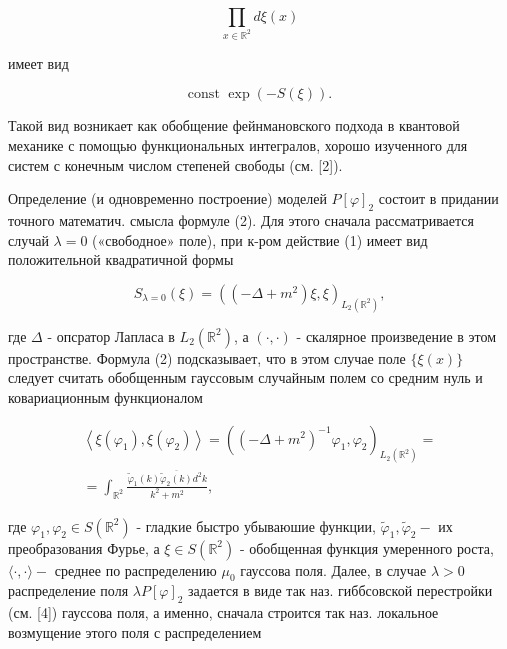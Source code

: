 \documentclass[10pt]{article}
\begin{document}
\[

\prod_{x \in \mathbb{R}^{2}} d \xi(x)

\]



имеет вид



\[

\text { const } \exp (-S(\xi)) \text {. }

\]



Такой вид возникает как обобщение фейнмановского подхода в квантовой механике с помощью функциональных интегралов, хорошо изученного для систем с конечным числом степеней свободы (см. [2]).



Определение (и одновременно построение) моделей $P[\varphi]_{2}$ состоит в придании точного математич. смысла формуле (2). Для этого сначала рассматривается случай $\lambda=0$ («свободное» поле), при к-ром действие (1) имеет вид положительной квадратичной формы



\[

S_{\lambda=0}(\xi)=\left(\left(-\Delta+m^{2}\right) \xi, \xi\right)_{L_{2}\left(\mathbb{R}^{2}\right)},

\]



где $\Delta$ - опсратор Лапласа в $L_{2}\left(\mathbb{R}^{2}\right)$, а $(\cdot, \cdot)$ - скалярное произведение в этом пространстве. Формула (2) подсказывает, что в этом случае поле $\{\xi(x)\}$ следует считать обобщенным гауссовым случайным полем со средним нуль и ковариационным функционалом



\[

\begin{gathered}

\left\langle\xi\left(\varphi_{1}\right), \xi\left(\varphi_{2}\right)\right\rangle=\left(\left(-\Delta+m^{2}\right)^{-1} \varphi_{1}, \varphi_{2}\right)_{L_{2}\left(\mathbb{R}^{2}\right)}= \\

=\int_{\mathbb{R}^{2}} \frac{\tilde{\varphi}_{1}(k) \overline{\tilde{\varphi}_{2}(k)} d^{2} k}{k^{2}+m^{2}},

\end{gathered}

\]



где $\varphi_{1}, \varphi_{2} \in S\left(\mathbb{R}^{2}\right)$ - гладкие быстро убываюшие функции, $\widetilde{\varphi}_{1}, \widetilde{\varphi}_{2}-$ их преобразования Фурье, а $\xi \in S\left(\mathbb{R}^{2}\right)$ - обобщенная функция умеренного роста, $\langle\cdot, \cdot\rangle-$ среднее по распределению $\mu_{0}$ гауссова поля. Далее, в случае $\lambda>0$ распределение поля $\lambda P[\varphi]_{2}$ задается в виде так наз. гиббсовской перестройки (см. [4]) гауссова поля, а именно, сначала строится так наз. локальное возмущение этого поля с распределением
\end{document}
